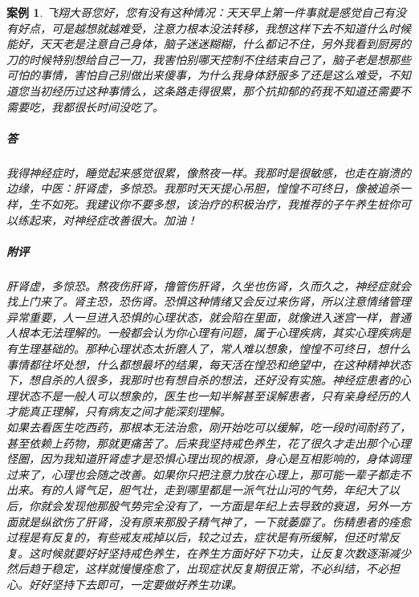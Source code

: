 \documentclass[fontset=founder]{ctexart}
\newtheorem{case}{案例}
\begin{document}
\begin{case}
    飞翔大哥您好，您有没有这种情况：天天早上第一件事就是感觉自己有没有好点，可是越想就越难受，注意力根本没法转移，我想这样下去不知道什么时候能好，天天老是注意自己身体，脑子迷迷糊糊，什么都记不住，另外我看到厨房的刀的时候特别想给自己一刀，我害怕别哪天控制不住结束自己了，脑子老是想那些可怕的事情，害怕自己别做出来傻事，为什么我身体舒服多了还是这么难受，不知道您当初经历过这种事情么，这条路走得很累，那个抗抑郁的药我不知道还需要不需要吃，我都很长时间没吃了。
    \subparagraph{答} 我得神经症时，睡觉起来感觉很累，像熬夜一样。我那时是很敏感，也走在崩溃的边缘，中医：肝肾虚，多惊恐。我那时天天提心吊胆，惶惶不可终日，像被追杀一样，生不如死。我建议你不要多想，该治疗的积极治疗，我推荐的子午养生桩你可以练起来，对神经症改善很大。加油！
    \subparagraph{附评} 肝肾虚，多惊恐。熬夜伤肝肾，撸管伤肝肾，久坐也伤肾，久而久之，神经症就会找上门来了。肾主恐，恐伤肾。恐惧这种情绪又会反过来伤肾，所以注意情绪管理异常重要，人一旦进入恐惧的心理状态，就会陷在里面，就像进入迷宫一样，普通人根本无法理解的。一般都会认为你心理有问题，属于心理疾病，其实心理疾病是有生理基础的。那种心理状态太折磨人了，常人难以想象，惶惶不可终日，想什么事情都往坏处想，什么都想最坏的结果，每天活在惶恐和绝望中，在这种精神状态下，想自杀的人很多，我那时也有想自杀的想法，还好没有实施。神经症患者的心理状态不是一般人可以想象的，医生也一知半解甚至误解患者，只有亲身经历的人才能真正理解，只有病友之间才能深刻理解。\\
    如果去看医生吃西药，那根本无法治愈，刚开始吃可以缓解，吃一段时间耐药了，甚至依赖上药物，那就更痛苦了。后来我坚持戒色养生，花了很久才走出那个心理怪圈，因为我知道肝肾虚才是恐惧心理出现的根源，身心是互相影响的，身体调理过来了，心理也会随之改善。如果你只把注意力放在心理上，那可能一辈子都走不出来。有的人肾气足，胆气壮，走到哪里都是一派气壮山河的气势，年纪大了以后，你就会发现他那股气势完全没有了，一方面是年纪上去导致的衰退，另外一方面就是纵欲伤了肝肾，没有原来那股子精气神了，一下就萎靡了。伤精患者的痊愈过程是有反复的，有些戒友戒掉以后，较之过去，症状是有所缓解，但还时常反复。这时候就要好好坚持戒色养生，在养生方面好好下功夫，让反复次数逐渐减少然后趋于稳定，这样就慢慢痊愈了，出现症状反复期很正常，不必纠结，不必担心。好好坚持下去即可，一定要做好养生功课。
\end{case}
\end{document}
